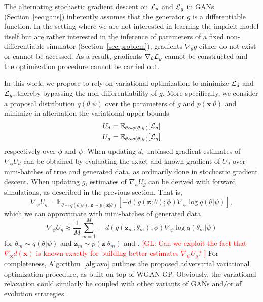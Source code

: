 \documentclass[twocolumn,superscriptaddress,aps]{revtex4-1}
\newcommand{\glnote}[1]{\textcolor{red}{[GL: #1]}}
\theoremstyle{plain}
\begin{document}
The alternating stochastic gradient descent on ${\cal L}_d$ and ${\cal L}_g$ in
GANs (Section~\ref{sec:gans}) inherently assumes that the generator $g$ is a differentiable function. In
the setting where we are not interested in learning the implicit model itself but are
rather interested in the inference of parameters of a fixed
non-differentiable simulator (Section~\ref{sec:problem}),
gradients $\nabla_\theta g$ either do not exist or cannot be accessed. As a
result, gradients $\nabla_\theta {\cal L}_g$ cannot be constructed and the
optimization procedure cannot be carried out.

In this work, we propose to rely on variational optimization to minimize ${\cal
L}_d$ and ${\cal L}_g$, thereby bypassing the non-differentiability of $g$. More
specifically, we consider a proposal distribution $q(\theta|\psi)$ over the
parameters of $g$ and $p(\mathbf{x}|\theta)$ and minimize in alternation the variational upper bounds
\begin{align}
    U_d &= \mathbb{E}_{\theta \sim q(\theta|\psi)} [ {\cal L}_d ] \label{eqn:vo-ud} \\
    U_g &= \mathbb{E}_{\theta \sim q(\theta|\psi)} [ {\cal L}_g ] \label{eqn:vo-ug}
\end{align} respectively over $\phi$ and $\psi$.
When updating
$d$, unbiased gradient estimates of $\nabla_\phi U_d$ can be obtained by
evaluating the exact and known gradient of $U_d$ over mini-batches of true and
generated data, as ordinarily done in stochastic gradient descent. When updating
$g$, estimates of $\nabla_\psi U_g$ can be derived with forward
simulations, as described in the previous section.
That is,
\begin{equation}
    \nabla_\psi U_g = \mathbb{E}_{\theta \sim q(\theta|\psi), \mathbf{z} \sim p(\mathbf{z}|\theta)}  [-d(g(\mathbf{z};\theta);\phi) \nabla_\psi \log q(\theta|\psi)],
\end{equation} which we can approximate with mini-batches of
generated data
\begin{equation}
    \nabla_\psi U_g \approx \frac{1}{M} \sum_{m=1}^M -d(g(\mathbf{z}_m; \theta_m); \phi) \nabla_\psi \log q(\theta_m|\psi)
\end{equation}
for $\theta_m \sim q(\theta|\psi)$ and $\mathbf{z}_m \sim p(\mathbf{z}|\theta_m)$ and .
\glnote{Can we exploit the fact that $\nabla_\mathbf{x} d(\mathbf{x})$
is known exactly for building better estimates $\tilde{\nabla}_\psi U_g$?
}
For completeness, Algorithm~\ref{alg:avo} outlines the proposed adversarial variational
optimization procedure, as built on top of WGAN-GP.
Obviously, the variational relaxation could similarly be coupled with
other variants of GANs and/or of evolution strategies.
\end{document}
